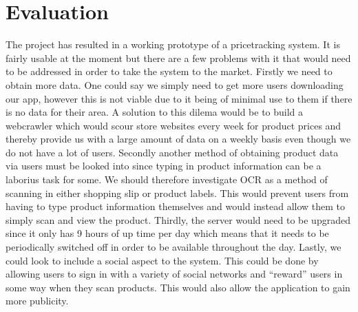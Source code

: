 \section{Evaluation}
The project has resulted in a working prototype of a pricetracking system. It is
fairly usable at the moment but there are a few problems with it that would need
to be addressed in order to take the system to the market. Firstly we need to
obtain more data. One could say we simply need to get more users downloading our
app, however this is not viable due to it being of minimal use to them if there
is no data for their area. A solution to this dilema would be to build a
webcrawler which would scour store websites every week for product prices and
thereby provide us with a large amount of data on a weekly basis even though we
do not have a lot of users. Secondly another method of obtaining product data
via users must be looked into since typing in product information can be a
laborius task for some. We should therefore investigate OCR as a method of
scanning in either shopping slip or product labels. This would prevent users
from having to type product information themselves and would instead allow them
to simply scan and view the product. Thirdly, the server would need to be
upgraded since it only has 9 hours of up time per day which means that it needs
to be periodically switched off in order to be available throughout the day.
Lastly, we could look to include a social aspect to the system. This could be
done by allowing users to sign in with a variety of social networks and
``reward'' users in some way when they scan products. This would also allow the
application to gain more publicity.
